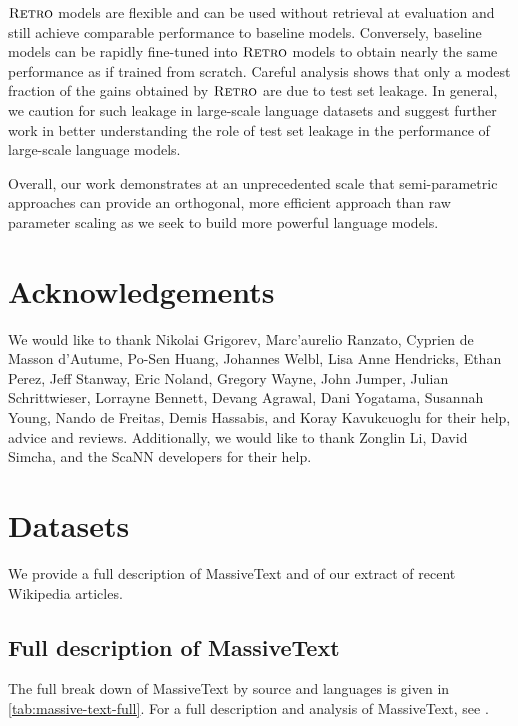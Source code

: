 \documentclass[11pt, a4paper, logo]{deepmind}
\newcommand{\retro}{\textsc{Retro}\xspace}
\begin{document}
$\retro$ models are flexible and can be used without retrieval at evaluation and still achieve comparable performance to baseline models. Conversely, baseline models can be rapidly fine-tuned into $\retro$ models to obtain nearly the same performance as if trained from scratch.
Careful analysis shows that only a modest fraction of the gains obtained by $\retro$ are due to test set leakage. In general, we caution for such leakage in large-scale language datasets and suggest further work in better understanding the role of test set leakage in the performance of large-scale language models.

Overall, our work demonstrates at an unprecedented scale that semi-parametric approaches can provide an orthogonal, more efficient approach than raw parameter scaling as we seek to build more powerful language models.

\section*{Acknowledgements}
We would like to thank Nikolai Grigorev, Marc'aurelio Ranzato, Cyprien de Masson d'Autume, Po-Sen Huang, Johannes Welbl, Lisa Anne Hendricks, Ethan Perez, Jeff Stanway, Eric Noland, Gregory Wayne, John Jumper, Julian Schrittwieser, Lorrayne Bennett, Devang Agrawal, Dani Yogatama, Susannah Young, Nando de Freitas, Demis Hassabis, and Koray Kavukcuoglu for their help, advice and reviews. 
Additionally, we would like to thank Zonglin Li, David Simcha, and the ScaNN developers for their help.







\pagebreak
\appendix

\section{Datasets}

We provide a full description of MassiveText and of our extract of recent Wikipedia articles.

\subsection{Full description of MassiveText}
\label{appendix:massive-text}
The full break down of MassiveText by source and languages is given in \autoref{tab:massive-text-full}.
For a full description and analysis of MassiveText, see \citet{rae2021gopher}.
\end{document}

